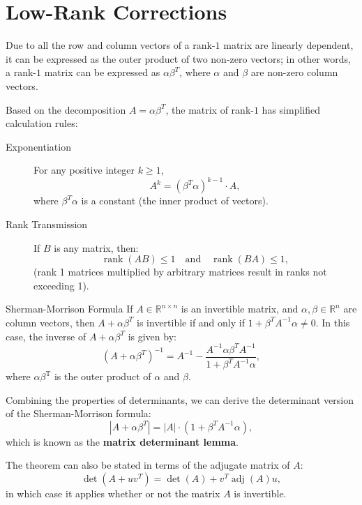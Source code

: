 \documentclass[11pt]{../../TexTemplate/elegantbook} %
\begin{document}
\section{Low-Rank Corrections}
Due to all the row and column vectors of a rank-\(1\) matrix are linearly dependent,
it can be expressed as the outer product of two non-zero vectors;
in other words, a rank-\(1\) matrix can be expressed as \( \alpha \beta^T \),
where \( \alpha \) and \( \beta \) are non-zero column vectors.

Based on the decomposition \( A = \alpha \beta^T \), the matrix of rank-\(1\) has simplified calculation rules:
\begin{property}
    \begin{description}
        \item [Exponentiation]  
        For any positive integer \( k \geq 1 \),
        \[
        A^k = (\beta^T\alpha)^{k-1} \cdot A,
        \]
        where \( \beta^T\alpha \) is a constant (the inner product of vectors).
        \item [Rank Transmission]  
        If \( B \) is any matrix, then:
        \[
        \operatorname{rank}(AB) \leq 1 \quad \text{and} \quad \operatorname{rank}(BA) \leq 1,
        \]
        (rank 1 matrices multiplied by arbitrary matrices result in ranks not exceeding 1).
    \end{description}
\end{property}



\begin{theorem}{Sherman-Morrison Formula}
    If \( A\in \mathbb{R}^{n\times n} \) is an invertible matrix, 
    and \( \alpha, \beta\in \mathbb{R}^n \) are column vectors, 
    then \( A + \alpha \beta^T \) is invertible if and only if \( 1 + \beta^T A^{-1} \alpha \neq 0 \). 
    In this case, the inverse of \( A + \alpha \beta^T \) is given by:
    \[
    \left(A + \alpha \beta^T\right)^{-1} = A^{-1} - \frac{A^{-1} \alpha \beta^T A^{-1}}{1 + \beta^T A^{-1} \alpha},
    \]
    where \(\alpha\beta^{\mathrm{T}}\) is the outer product of \(\alpha\) and \(\beta\).
\end{theorem}

\begin{note}
    Combining the properties of determinants, 
    we can derive the determinant version of the Sherman-Morrison formula:
    \[
    \left|A + \alpha \beta^T\right| = |A| \cdot \left(1 + \beta^T A^{-1} \alpha\right),
    \]
    which is known as the \textbf{matrix determinant lemma}.

    The theorem can also be stated in terms of the adjugate matrix of \( A \):
    \[
    \det(A + uv^T) = \det(A) + v^T \operatorname{adj}(A) u,
    \]
    in which case it applies whether or not the matrix \( A \) is invertible.
\end{note}
\end{document}

